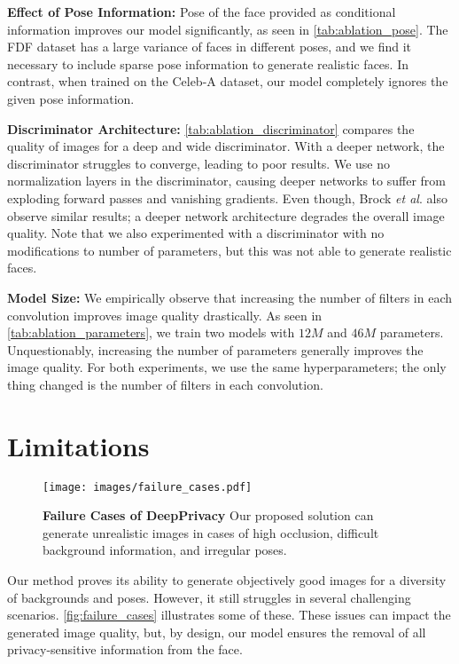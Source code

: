 \documentclass[runningheads]{llncs}
\newcommand{\etal}{\textit{et al}. }
\begin{document}
\textbf{Effect of Pose Information:}
Pose of the face provided as conditional information improves our model significantly, as seen in \autoref{tab:ablation_pose}. The FDF dataset has a large variance of faces in different poses, and we find it necessary to include sparse pose information to generate realistic faces.
In contrast, when trained on the Celeb-A dataset, our model completely ignores the given pose information.

\textbf{Discriminator Architecture:}
\autoref{tab:ablation_discriminator} compares the quality of images for a deep and wide discriminator. With a deeper network, the discriminator struggles to converge, leading to poor results. We use no normalization layers in the discriminator, causing deeper networks to suffer from exploding forward passes and vanishing gradients.
Even though, Brock \etal \cite{Brock2018} also observe  similar results; a deeper network architecture degrades the overall image quality.
Note that we also experimented with a discriminator with no modifications to number of parameters, but this was not able to generate realistic faces.

\textbf{Model Size:}
We empirically observe that increasing the number of filters in each convolution improves image quality drastically. 
As seen in \autoref{tab:ablation_parameters}, we train two models with $12M$ and $46M$ parameters. Unquestionably, increasing the number of parameters generally improves the image quality. For both experiments, we use the same hyperparameters; the only thing changed is the number of filters in each convolution. 

 \section{Limitations}

\begin{figure}
    \centering
    \texttt{[image: images/failure\_cases.pdf]}
    \caption{\textbf{Failure Cases of DeepPrivacy} Our proposed solution can generate unrealistic images in cases of high occlusion, difficult background information, and irregular poses. }
    \label{fig:failure_cases}
\end{figure}

Our method proves its ability to generate objectively good images for a diversity of backgrounds and poses. However, it still struggles in several challenging scenarios. \autoref{fig:failure_cases} illustrates some of these. 
These issues can impact the generated image quality, but, by design, our model ensures the removal of all privacy-sensitive information from the face.  
\end{document}
